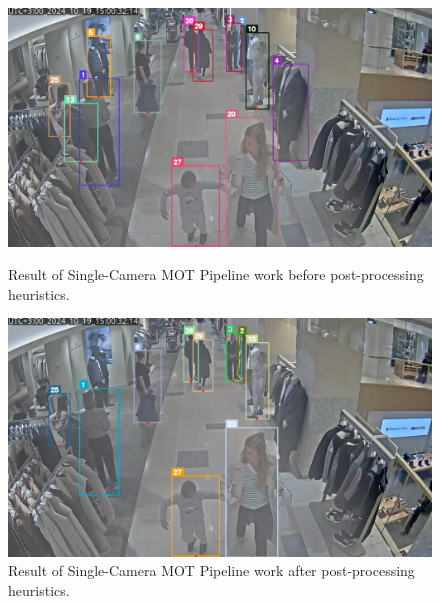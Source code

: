 \documentclass[12pt, a4paper]{article}
\begin{document}
\begin{figure}[h]
    \centering
    \begin{minipage}{0.45\textwidth}
        \centering
        \includegraphics[width=\linewidth]{pictures/manik_a.jpeg}
        \caption{Result of Single-Camera MOT Pipeline work before post-processing heuristics.}
        \label{fig:manik_a}
    \end{minipage}
    \begin{minipage}{0.45\textwidth}
        \centering
        \includegraphics[width=\linewidth]{pictures/manik_b.jpeg}
        \caption{Result of Single-Camera MOT Pipeline work after post-processing heuristics.}
        \label{fig:manik_b}
    \end{minipage}
\end{figure}
\end{document}
